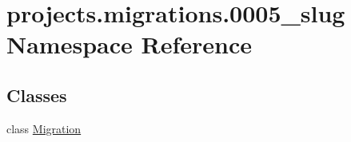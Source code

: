 \hypertarget{namespaceprojects_1_1migrations_1_10005__slug}{\section{projects.\-migrations.0005\-\_\-slug Namespace Reference}
\label{namespaceprojects_1_1migrations_1_10005__slug}
}
\subsection*{Classes}
\begin{DoxyCompactItemize}
\item 
class \hyperlink{classprojects_1_1migrations_1_10005__slug_1_1_migration}{Migration}
\end{DoxyCompactItemize}
